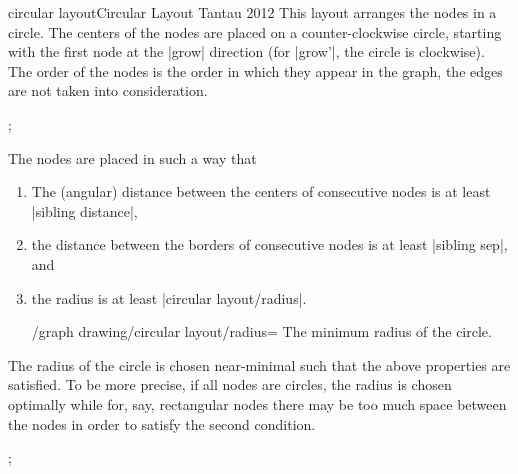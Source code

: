 \begin{gdalgorithm}{circular layout}{Circular Layout Tantau 2012}
  This layout arranges the nodes in a circle. The centers of the nodes
  are placed on a counter-clockwise circle, starting with the first
  node at the |grow| direction (for |grow'|, the circle is
  clockwise). The order of the nodes is the order in which they appear
  in the graph, the edges are not taken into consideration.

\begin{codeexample}[]
\tikz[>=spaced stealth']
  ;    
\end{codeexample}

  The nodes are placed in such a way that
  \begin{enumerate}
  \item The (angular) distance between the centers of consecutive
    nodes is at least  |sibling distance|,
  \item the distance between the borders of consecutive nodes is at
    least |sibling sep|, and
  \item the radius is at least |circular layout/radius|.
    \begin{key}{/graph drawing/circular layout/radius=}
      The minimum radius of the circle.
    \end{key}
  \end{enumerate}
  The radius of the circle is chosen near-minimal such that the above
  properties are satisfied. To be more precise, if all nodes are
  circles, the radius is chosen optimally while for, say, rectangular
  nodes there may be too much space between the nodes in order to
  satisfy the second condition.

\begin{codeexample}[]
\tikz {}; 
\end{codeexample}

\begin{codeexample}[]
\end{codeexample}
\end{gdalgorithm}
